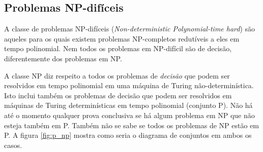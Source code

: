 \documentclass[a4paper,12pt,oneside,onecolumn]{uerj}
\begin{document}
\subsection{Problemas NP-difíceis}

A classe de problemas NP-difíceis (\emph{Non-deterministic Polynomial-time hard}) são aqueles para os quais existem problemas NP-completos redutíveis a eles em tempo polinomial. Nem todos os problemas em NP-difícil são de decisão, diferentemente dos problemas em NP.

A classe NP diz respeito a todos os problemas de \emph{decisão} que podem ser resolvidos em tempo polinomial em uma máquina de Turing não-determinística. Isto inclui também os problemas de decisão que podem ser resolvidos em máquinas de Turing determinísticas em tempo polinomial (conjunto P). Não há até o momento qualquer prova conclusiva se há algum problema em NP que não esteja também em P. Também não se sabe se todos os problemas de NP estão em P. A figura \ref{fig:p_np} mostra como seria o diagrama de conjuntos em ambos os casos.
\end{document}
